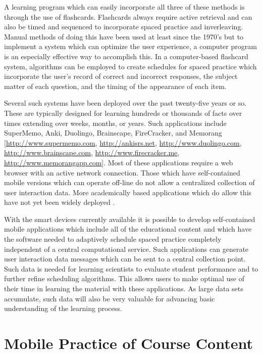 \documentclass[runningheads,a4paper]{llncs}
\begin{document}
A learning program which can easily incorporate all three of these methods is through the use of flashcards.  Flashcards always require active retrieval and can also be timed and sequenced to incorporate spaced practice and inverleaving.  Manual methods of doing this have been used at least since the 1970's \cite{Leitner1972} but to implement a system which can optimize the user experience, a computer program is an especially effective way to accomplish this.  In a computer-based flashcard system, algorithms can be employed to create schedules for spaced practice which incorporate the user's record of correct and incorrect responses, the subject matter of each question, and the timing of the appearance of each item.

Several such systems have been deployed over the past twenty-five years or so.  These are typically designed for learning hundreds or thousands of facts over times extending over weeks, months, or years.  Such applications include SuperMemo, Anki, Duolingo, Brainscape, FireCracker, and Memorang [\url{http://www.supermemo.com}, \url{http://ankisrs.net}, \url{http://www.duolingo.com}, \url{http://www.brainscape.com}, \url{http://www.firecracker.me}, \url{http://www.memorangapp.com}].  Most of these applications require a web browser with an active network connection.  Those which have self-contained mobile versions which can operate off-line do not allow a centralized collection of user interaction data.  More academically based applications which do allow this have not yet been widely deployed \cite{Kam2009,Pavlik2016}.

With the smart devices currently available it is possible to develop self-contained mobile applications which include all of the educational content and which have the software needed to adaptively schedule spaced practice completely independent of a central computational service.  Such applications can generate user interaction data messages which can be sent to a central collection point.  Such data is needed for learning scientists to evaluate student performance and to further refine scheduling algorithms.  This allows users to make optimal use of their time in learning the material with these applications.  As large data sets accumulate, such data will also be very valuable for advancing basic understanding of the learning process.


\section{Mobile Practice of Course Content}
\end{document}
